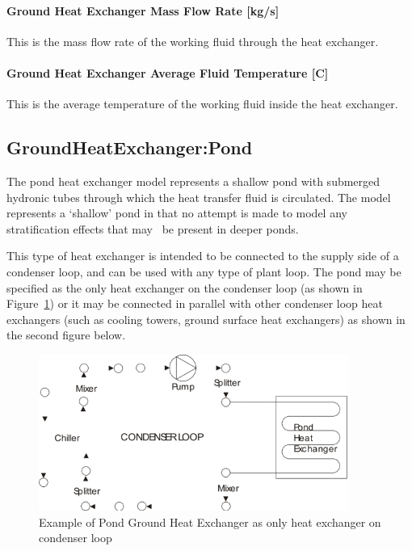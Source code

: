 \paragraph{Ground Heat Exchanger Mass Flow Rate {[}kg/s{]}}\label{ground-heat-exchanger-mass-flow-rate-kgs-1}

This is the mass flow rate of the working fluid through the heat exchanger.

\paragraph{Ground Heat Exchanger Average Fluid Temperature {[}C{]}}\label{ground-heat-exchanger-average-fluid-temperature-c-1}

This is the average temperature of the working fluid inside the heat exchanger.

\subsection{GroundHeatExchanger:Pond}\label{groundheatexchangerpond}

The pond heat exchanger model represents a shallow pond with submerged hydronic tubes through which the heat transfer fluid is circulated. The model represents a `shallow' pond in that no attempt is made to model any stratification effects that may~ be present in deeper ponds.

This type of heat exchanger is intended to be connected to the supply side of a condenser loop, and can be used with any type of plant loop. The pond may be specified as the only heat exchanger on the condenser loop (as shown in Figure~\ref{fig:example-of-pond-ground-heat-exchanger-as-only}) or it may be connected in parallel with other condenser loop heat exchangers (such as cooling towers, ground surface heat exchangers) as shown in the second figure below.

\begin{figure}[hbtp] %
\centering
\includegraphics[width=0.9\textwidth, height=0.9\textheight, keepaspectratio=true]{media/image203.png}
\caption{Example of Pond Ground Heat Exchanger as only heat exchanger on condenser loop \protect \label{fig:example-of-pond-ground-heat-exchanger-as-only}}
\end{figure}

